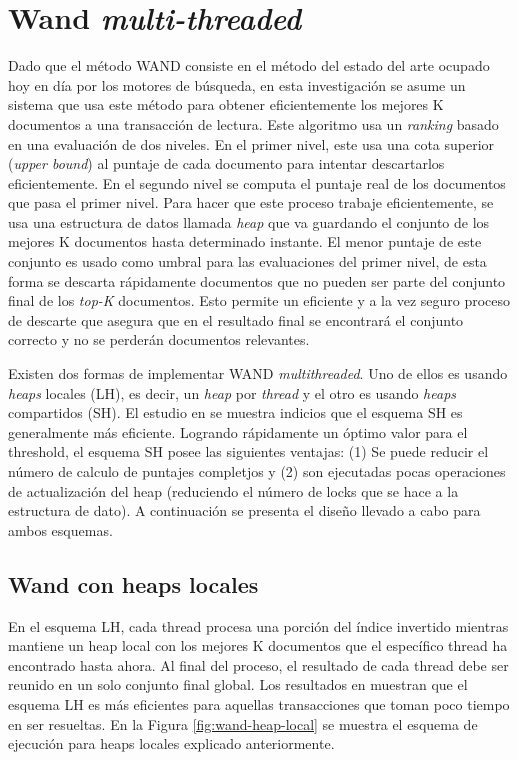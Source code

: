 \section{Wand \textit{multi-threaded}}
\label{scheduling:wm}
Dado que el método WAND \citep{Broder:2003} consiste en el método del estado del arte ocupado hoy en día por los motores de búsqueda, en esta investigación se asume un sistema que usa este método para obtener eficientemente los mejores K documentos a una transacción de lectura. Este algoritmo usa un \textit{ranking} basado en una evaluación de dos niveles. En el primer nivel, este usa una cota superior (\textit{upper bound}) al puntaje de cada documento para intentar descartarlos eficientemente. En el segundo nivel se computa el puntaje real de los documentos que pasa el primer nivel. Para hacer que este proceso trabaje eficientemente, se usa una estructura de datos llamada \textit{heap} que va guardando el conjunto de los mejores K documentos hasta determinado instante. El menor puntaje de este conjunto es usado como umbral para las evaluaciones del primer nivel, de esta forma se descarta rápidamente documentos que no pueden ser parte del conjunto final de los \textit{top-K} documentos. Esto permite un eficiente y a la vez seguro proceso de descarte que asegura que en el resultado final se encontrará el conjunto correcto y no se perderán documentos relevantes.

Existen dos formas de implementar WAND \textit{multithreaded}. Uno de ellos es usando \textit{heaps} locales (LH), es decir, un \textit{heap} por \textit{thread} y el otro es usando \textit{heaps} compartidos (SH). El estudio en \citep{Rojas:2013} se muestra indicios que el esquema SH es generalmente más eficiente. Logrando rápidamente un óptimo valor para el threshold, el esquema SH posee las siguientes ventajas: (1) Se puede reducir el número de calculo de puntajes completjos y (2) son ejecutadas pocas operaciones de actualización del heap (reduciendo el número de locks que se hace a la estructura de dato). A continuación se presenta el diseño llevado a cabo para ambos esquemas.


\subsection{Wand con heaps locales}
\label{scheduling:whl}
En el esquema LH, cada thread procesa una porción del índice invertido mientras mantiene un heap local con los mejores K documentos que el específico thread ha encontrado hasta ahora. Al final del proceso, el resultado de cada thread debe ser reunido en un solo conjunto final global. Los resultados en \citep{Rojas:2013} muestran que el esquema LH es más eficientes para aquellas transacciones que toman poco tiempo en ser resueltas. En la Figura \ref{fig:wand-heap-local} se muestra el esquema de ejecución para heaps locales explicado anteriormente. 

